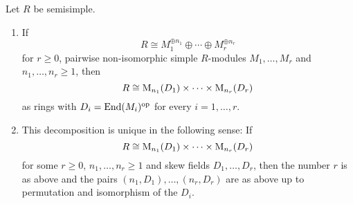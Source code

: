 %   


\begin{theorem}
  Let $R$ be semisimple.
  \begin{enumerate}
    \item
      If
      \[
              R
        \cong M_1^{\oplus n_1} \oplus \dotsb \oplus M_r^{\oplus n_r}
      \]
      for $r \geq 0$, pairwise non-isomorphic simple $R$-modules $M_1, \dotsc, M_r$ and $n_1, \dotsc, n_r \geq 1$, then
      \[
              R
        \cong \operatorname{M}_{n_1}(D_1) \times \dotsb \times  \operatorname{M}_{n_r}(D_r)
      \]
      as rings with $D_i = \operatorname{End}(M_i)^{\mathrm{op}}$ for every $i = 1, \dotsc, r$.
      \item
      This decomposition is unique in the following sense:
      If
      \[
              R
        \cong \operatorname{M}_{n_1}(D_1) \times \dotsb \times  \operatorname{M}_{n_r}(D_r)
      \]
      for some $r \geq 0$, $n_1, \dotsc, n_r \geq 1$ and skew fields $D_1, \dotsc, D_r$, then the number $r$ is as above and the pairs $(n_1,D_1), \dotsc, (n_r,D_r)$ are as above up to permutation and isomorphism of the $D_i$.
  \end{enumerate}
\end{theorem}


